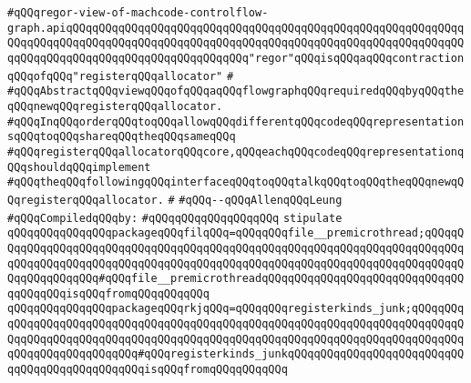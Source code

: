 \label{src/lib/compiler/back/low/regor/regor-view-of-machcode-controlflow-graph.api}
\verb|#qQQqregor-view-of-machcode-controlflow-graph.apiqQQqqQQqqQQqqQQqqQQqqQQqqQQqqQQqqQQqqQQqqQQqqQQqqQQqqQQqqQQqqQQqqQQqqQQqqQQqqQQqqQQqqQQqqQQqqQQqqQQqqQQqqQQqqQQqqQQqqQQqqQQqqQQqqQQqqQQqqQQqqQQqqQQqqQQqqQQqqQQqqQQqqQQq"regor"qQQqisqQQqaqQQqcontractionqQQqofqQQq"registerqQQqallocator"|\newline
\verb|#|\newline
\verb|#qQQqAbstractqQQqviewqQQqofqQQqaqQQqflowgraphqQQqrequiredqQQqbyqQQqtheqQQqnewqQQqregisterqQQqallocator.|\newline
\verb|#qQQqInqQQqorderqQQqtoqQQqallowqQQqdifferentqQQqcodeqQQqrepresentationsqQQqtoqQQqshareqQQqtheqQQqsameqQQq|\newline
\verb|#qQQqregisterqQQqallocatorqQQqcore,qQQqeachqQQqcodeqQQqrepresentationqQQqshouldqQQqimplement|\newline
\verb|#qQQqtheqQQqfollowingqQQqinterfaceqQQqtoqQQqtalkqQQqtoqQQqtheqQQqnewqQQqregisterqQQqallocator.|\newline
\verb|#|\newline
\verb|#qQQq--qQQqAllenqQQqLeung|\newline
\newline
\verb|#qQQqCompiledqQQqby:|\newline
\verb|#qQQqqQQqqQQqqQQqqQQq|\newline
\newline
\newline
\verb|stipulate|\newline
\verb|qQQqqQQqqQQqqQQqpackageqQQqfilqQQq=qQQqqQQqfile__premicrothread;qQQqqQQqqQQqqQQqqQQqqQQqqQQqqQQqqQQqqQQqqQQqqQQqqQQqqQQqqQQqqQQqqQQqqQQqqQQqqQQqqQQqqQQqqQQqqQQqqQQqqQQqqQQqqQQqqQQqqQQqqQQqqQQqqQQqqQQqqQQqqQQqqQQqqQQqqQQqqQQq#qQQqfile__premicrothreadqQQqqQQqqQQqqQQqqQQqqQQqqQQqqQQqqQQqqQQqisqQQqfromqQQqqQQqqQQq|\newline
\verb|qQQqqQQqqQQqqQQqpackageqQQqrkjqQQq=qQQqqQQqregisterkinds_junk;qQQqqQQqqQQqqQQqqQQqqQQqqQQqqQQqqQQqqQQqqQQqqQQqqQQqqQQqqQQqqQQqqQQqqQQqqQQqqQQqqQQqqQQqqQQqqQQqqQQqqQQqqQQqqQQqqQQqqQQqqQQqqQQqqQQqqQQqqQQqqQQqqQQqqQQqqQQqqQQqqQQqqQQq#qQQqregisterkinds_junkqQQqqQQqqQQqqQQqqQQqqQQqqQQqqQQqqQQqqQQqqQQqqQQqisqQQqfromqQQqqQQqqQQq|\newline
